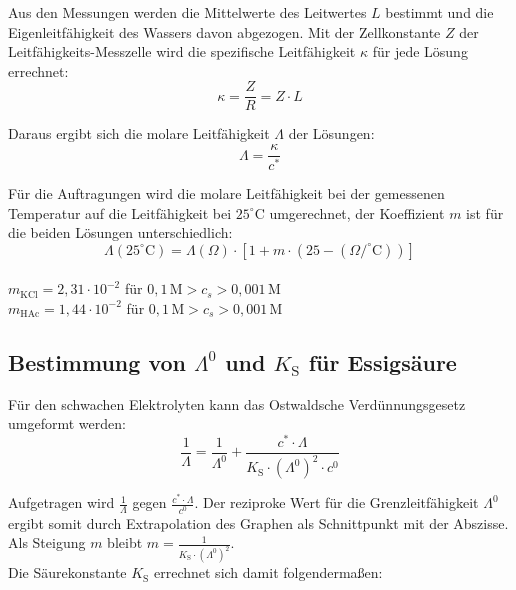\documentclass[12pt,a4paper,titlepage,headinclude,bibtotoc]{scrartcl}
\begin{document}
Aus den Messungen werden die Mittelwerte des Leitwertes $L$ bestimmt und die Eigenleitfähigkeit des Wassers davon abgezogen. Mit der Zellkonstante $Z$ der Leitfähigkeits-Messzelle wird die spezifische Leitfähigkeit $\kappa$ für jede Lösung errechnet:\\

\begin{equation}
\kappa = \frac{Z}{R} = Z \cdot L
\end{equation}

Daraus ergibt sich die molare Leitfähigkeit $\Lambda$ der Lösungen:\\

\begin{equation}
\Lambda = \frac{\kappa}{c^*}
\end{equation}

Für die Auftragungen wird die molare Leitfähigkeit bei der gemessenen Temperatur auf die Leitfähigkeit bei $25^\circ\text{C}$ umgerechnet, der Koeffizient $m$ ist für die beiden Lösungen unterschiedlich:\\

\begin{equation}
\Lambda (25^\circ\text{C}) = \Lambda(\Omega) \cdot [1+ m \cdot (25- (\Omega/^\circ\text{C}))]
\end{equation}\\

{\centering
$m_{\mathrm{KCl}} = 2,31 \cdot 10^{-2}$ für $0,1\, \mathrm{M} > c_s > 0,001\, \mathrm{M}$\\
$m_{\mathrm{HAc}} = 1,44 \cdot 10^{-2}$ für $0,1\, \mathrm{M} > c_s > 0,001\, \mathrm{M}$\\}



\subsection{Bestimmung von $\Lambda^0$ und $K_{\mathrm{S}}$ für Essigsäure}

Für den schwachen Elektrolyten kann das Ostwaldsche Verdünnungsgesetz umgeformt werden:\\

\begin{equation}
\frac{1}{\Lambda} = \frac{1}{\Lambda^0} + \frac{c^* \cdot \Lambda}{K_{\mathrm{S}} \cdot (\Lambda^0)^2 \cdot c^0}
\end{equation}

Aufgetragen wird $\frac{1}{\Lambda}$ gegen $\frac{c^* \cdot \Lambda}{c^0}$.
Der reziproke Wert für die Grenzleitfähigkeit $\Lambda^0$ ergibt somit durch Extrapolation des Graphen als Schnittpunkt mit der Abszisse.\\
Als Steigung $m$ bleibt  $m = \frac{1}{K_{\mathrm{S}} \cdot (\Lambda^0)^2 }$.\\
Die Säurekonstante $K_{\mathrm{S}}$ errechnet sich damit folgendermaßen:\\
\end{document}
